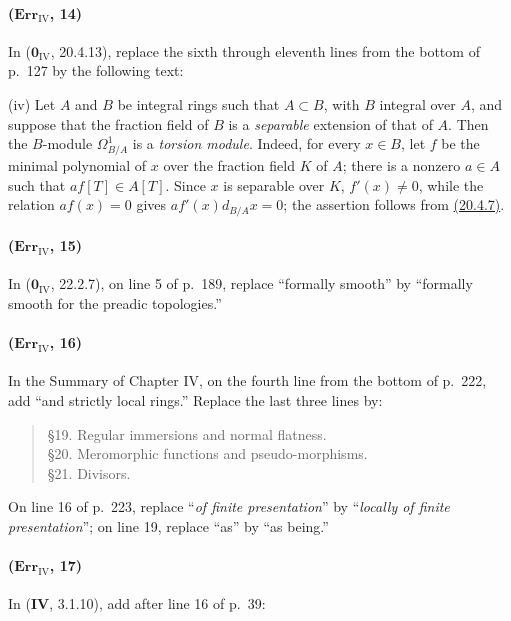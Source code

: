 \paragraph{($\mathbf{Err}_{\mathrm{IV}}$, 14)}
In ($\mathbf{0}_{\mathrm{IV}}$, 20.4.13), replace the sixth through eleventh
lines from the bottom of p.~127 by the following text:

\medskip
\noindent
(iv) Let $A$ and $B$ be integral rings such that $A\subset B$, with
$B$ integral over $A$, and suppose that the fraction field of $B$ is a
\emph{separable} extension of that of $A$.  Then the $B$-module
$\Omega^1_{B/A}$ is a \emph{torsion module}.  Indeed, for every $x\in B$, let
$f$ be the minimal polynomial of $x$ over the fraction field $K$ of
$A$; there is a nonzero $a\in A$ such that $af[T]\in A[T]$.  Since $x$
is separable over $K$, $f'(x)\neq0$, while the relation $af(x)=0$
gives $af'(x)d_{B/A}x=0$; the assertion follows from {\hyperref[IV.20]{(20.4.7)}}.

\paragraph{($\mathbf{Err}_{\mathrm{IV}}$, 15)}
In ($\mathbf{0}_{\mathrm{IV}}$, 22.2.7), on line 5 of p.~189, replace
``formally smooth'' by ``formally smooth for the preadic topologies.''

\paragraph{($\mathbf{Err}_{\mathrm{IV}}$, 16)}
In the Summary of Chapter IV, on the fourth line from the bottom of
p.~222, add ``and strictly local rings.''  Replace the last three lines
by:
\begin{quote}
\S19. Regular immersions and normal flatness.\\
\S20. Meromorphic functions and pseudo-morphisms.\\
\S21. Divisors.
\end{quote}
On line 16 of p.~223, replace ``\emph{of finite presentation}'' by ``\emph{locally of
finite presentation}''; on line 19, replace ``as'' by ``as being.''

\paragraph{($\mathbf{Err}_{\mathrm{IV}}$, 17)}
In (\textbf{IV}, 3.1.10), add after line 16 of p.~39:

